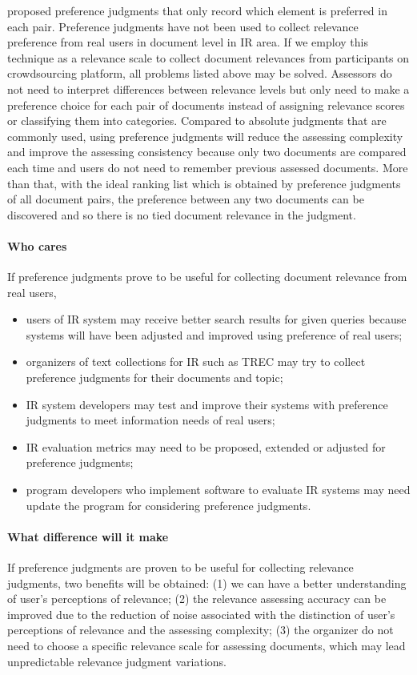 \documentclass{article}
\begin{document}
\citet{eval.aggregated.search} proposed preference judgments that only record which element is preferred in each pair. Preference judgments have not been used to collect relevance preference from real users in document level in IR area. If we employ this technique as a relevance scale to collect document relevances from participants on crowdsourcing platform, all problems listed above may be solved. Assessors do not need to interpret differences between relevance levels but only need to make a preference choice for each pair of documents instead of assigning relevance scores or classifying them into categories. Compared to absolute judgments that are commonly used, using preference judgments will reduce the assessing complexity and improve the assessing consistency  because only two documents are compared each time and users do not need to remember previous assessed documents. More than that, with the ideal ranking list which is obtained by preference judgments of all document pairs, the preference between any two documents can be discovered and so there is no tied document relevance in the judgment. 


\paragraph{Who cares} If preference judgments prove to be useful for collecting document relevance from real users, 
\begin{itemize}
\item users of IR system may receive better search results for given queries because systems will have been adjusted and improved using preference of real users;
\item organizers of text collections for IR such as TREC may try to collect preference judgments for their documents and topic; 
\item IR system developers may test and improve their systems with preference judgments to meet information needs of real users;
\item IR evaluation metrics may need to be proposed, extended or adjusted for preference judgments;
\item program developers who implement software to evaluate IR systems may need update the program for considering preference judgments.
\end{itemize}

\paragraph{What difference will it make}
If preference judgments are proven to be useful for collecting relevance judgments, two benefits will be obtained:
(1) we can have a better understanding of user's perceptions of relevance;
(2) the relevance assessing accuracy can be improved due to the reduction of noise associated with the distinction of user's perceptions of relevance and the assessing complexity;
(3) the organizer do not need to choose a specific relevance scale for assessing documents, which may lead unpredictable relevance judgment variations.
\end{document}
